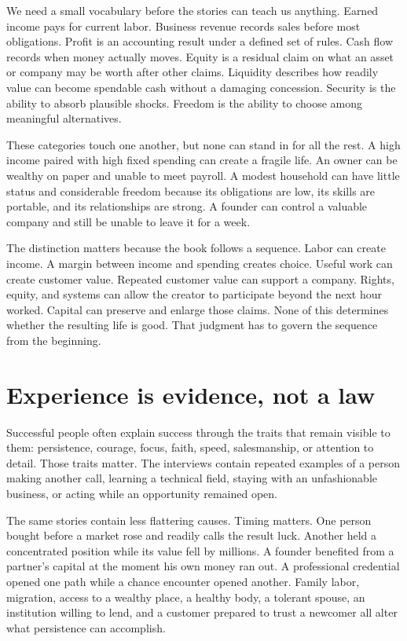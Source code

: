 We need a small vocabulary before the stories can teach us anything. Earned
income pays for current labor. Business revenue records sales before most
obligations. Profit is an accounting result under a defined set of rules. Cash
flow records when money actually moves. Equity is a residual claim on what an
asset or company may be worth after other claims. Liquidity describes how
readily value can become spendable cash without a damaging concession. Security
is the ability to absorb plausible shocks. Freedom is the ability to choose
among meaningful alternatives.

These categories touch one another, but none can stand in for all the rest. A
high income paired with high fixed spending can create a fragile life. An owner
can be wealthy on paper and unable to meet payroll. A modest household can have
little status and considerable freedom because its obligations are low, its
skills are portable, and its relationships are strong. A founder can control a
valuable company and still be unable to leave it for a week.

The distinction matters because the book follows a sequence. Labor can create
income. A margin between income and spending creates choice. Useful work can
create customer value. Repeated customer value can support a company. Rights,
equity, and systems can allow the creator to participate beyond the next hour
worked. Capital can preserve and enlarge those claims. None of this determines
whether the resulting life is good. That judgment has to govern the sequence
from the beginning.

\section*{Experience is evidence, not a law}

Successful people often explain success through the traits that remain visible
to them: persistence, courage, focus, faith, speed, salesmanship, or attention
to detail. Those traits matter. The interviews contain repeated examples of a
person making another call, learning a technical field, staying with an
unfashionable business, or acting while an opportunity remained open.

The same stories contain less flattering causes. Timing matters. One person
bought before a market rose and readily calls the result luck. Another held a
concentrated position while its value fell by millions. A founder benefited
from a partner's capital at the moment his own money ran out. A professional
credential opened one path while a chance encounter opened another. Family
labor, migration, access to a wealthy place, a healthy body, a tolerant spouse,
an institution willing to lend, and a customer prepared to trust a newcomer
all alter what persistence can accomplish.

